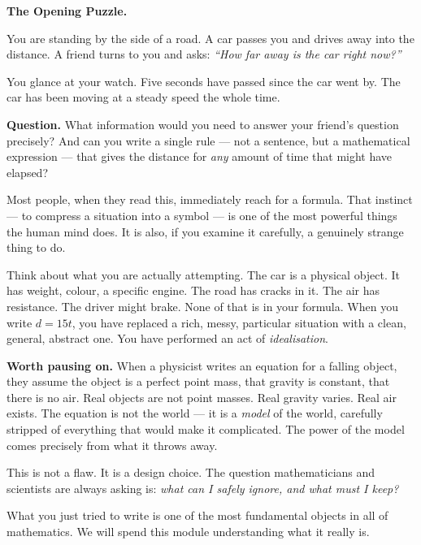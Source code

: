 \documentclass[12pt, a4paper]{article}
\begin{document}
\begin{puzzlebox}
\textbf{The Opening Puzzle.}

You are standing by the side of a road. A car passes you and drives away into the distance. A friend turns to you and asks: \textit{``How far away is the car right now?''}

You glance at your watch. Five seconds have passed since the car went by. The car has been moving at a steady speed the whole time.

\medskip
\textbf{Question.} What information would you need to answer your friend's question precisely? And can you write a single rule --- not a sentence, but a mathematical expression --- that gives the distance for \emph{any} amount of time that might have elapsed?
\end{puzzlebox}

\medskip
Most people, when they read this, immediately reach for a formula. That instinct --- to compress a situation into a symbol --- is one of the most powerful things the human mind does. It is also, if you examine it carefully, a genuinely strange thing to do.

Think about what you are actually attempting. The car is a physical object. It has weight, colour, a specific engine. The road has cracks in it. The air has resistance. The driver might brake. None of that is in your formula. When you write $d = 15t$, you have replaced a rich, messy, particular situation with a clean, general, abstract one. You have performed an act of \emph{idealisation}.

\begin{thought}
\textbf{Worth pausing on.} When a physicist writes an equation for a falling object, they assume the object is a perfect point mass, that gravity is constant, that there is no air. Real objects are not point masses. Real gravity varies. Real air exists. The equation is not the world --- it is a \emph{model} of the world, carefully stripped of everything that would make it complicated. The power of the model comes precisely from what it throws away.

This is not a flaw. It is a design choice. The question mathematicians and scientists are always asking is: \textit{what can I safely ignore, and what must I keep?}
\end{thought}

\medskip
What you just tried to write is one of the most fundamental objects in all of mathematics. We will spend this module understanding what it really is.
\end{document}
